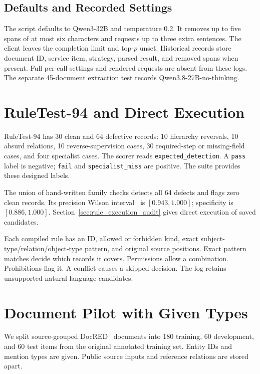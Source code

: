 \subsection{Defaults and Recorded Settings}

The script defaults to Qwen3-32B and temperature 0.2.
It removes up to five spans of at most six characters and requests
up to three extra sentences. The client leaves the completion limit
and top-$p$ unset. Historical records store document ID, service item,
strategy, parsed result, and removed spans when present.
Full per-call settings and rendered requests are absent from these logs.
The separate 45-document extraction test records Qwen3.8-27B-no-thinking.

\section{RuleTest-94 and Direct Execution}

\label{app:testset}

RuleTest-94 has 30 clean and 64 defective records: 10 hierarchy reversals,
10 absurd relations, 10 reverse-supervision cases, 30 required-step or
missing-field cases, and four specialist cases. The scorer reads
\texttt{expected\_detection}. A \texttt{pass} label is negative;
\texttt{fail} and \texttt{specialist\_miss} are positive.
The suite provides these designed labels.

The union of hand-written family checks detects all 64 defects and flags
zero clean records. Its precision Wilson interval~\cite{wilson1927probable} is $[0.943,1.000]$;
specificity is $[0.886,1.000]$. Section~\ref{sec:rule_execution_audit}
gives direct execution of saved candidates.

\label{app:rule_format}

Each compiled rule has an ID, allowed or forbidden kind, exact
subject-type/relation/object-type pattern, and original source positions.
Exact pattern matches decide which records it covers.
Permissions allow a combination. Prohibitions flag it.
A conflict causes a skipped decision. The log retains unsupported
natural-language candidates.

\section{Document Pilot with Given Types}

\label{app:docred_pilot}

We split source-grouped DocRED~\cite{ref_docred} documents into 180 training,
60 development, and 60 test items from the original annotated training
set. Entity IDs and mention types are given. Public source inputs and
reference relations are stored apart.


